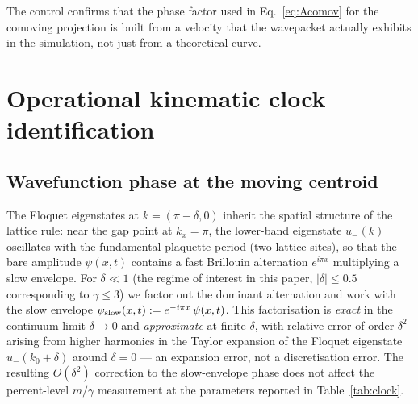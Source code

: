\documentclass[11pt,a4paper]{article}
\begin{document}
The control confirms that the phase factor used in
Eq.~\eqref{eq:Acomov} for the comoving projection is built
from a velocity that the wavepacket actually exhibits in the
simulation, not just from a theoretical curve.

\section{Operational kinematic clock identification}
\label{sec:operational}

\subsection{Wavefunction phase at the moving centroid}

The Floquet eigenstates at $k = (\pi - \delta, 0)$ inherit the
spatial structure of the lattice rule: near the gap point at
$k_x = \pi$, the lower-band eigenstate $u_-(k)$ oscillates with
the fundamental plaquette period (two lattice sites), so that
the bare amplitude $\psi(x,t)$ contains a fast Brillouin
alternation $e^{i\pi x}$ multiplying a slow envelope. For
$\delta \ll 1$ (the regime of interest in this paper, $|\delta|
\le 0.5$ corresponding to $\gamma \le 3$) we factor out the
dominant alternation and work with the slow envelope
$\psi_{\rm slow}(x,t) := e^{-i\pi x}\,\psi(x,t)$. This
factorisation is \emph{exact} in the continuum limit
$\delta \to 0$ and \emph{approximate} at finite $\delta$, with
relative error of order $\delta^2$ arising from higher harmonics
in the Taylor expansion of the Floquet eigenstate
$u_-(k_0+\delta)$ around $\delta = 0$ --- an expansion error,
not a discretisation error. The resulting $O(\delta^2)$
correction to the slow-envelope phase does not affect the
percent-level
$m/\gamma$ measurement at the parameters reported in
Table~\ref{tab:clock}.
\end{document}
